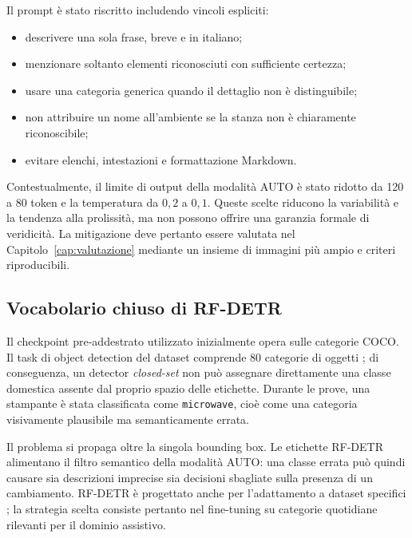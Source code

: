 Il prompt è stato riscritto includendo vincoli espliciti:

\begin{itemize}
    \item descrivere una sola frase, breve e in italiano;
    \item menzionare soltanto elementi riconosciuti con sufficiente certezza;
    \item usare una categoria generica quando il dettaglio non è distinguibile;
    \item non attribuire un nome all'ambiente se la stanza non è chiaramente
    riconoscibile;
    \item evitare elenchi, intestazioni e formattazione Markdown.
\end{itemize}

Contestualmente, il limite di output della modalità AUTO è stato ridotto da
120 a 80 token e la temperatura da \(0{,}2\) a \(0{,}1\). Queste scelte
riducono la variabilità e la tendenza alla prolissità, ma non possono offrire
una garanzia formale di veridicità. La mitigazione deve pertanto essere
valutata nel Capitolo~\ref{cap:valutazione} mediante un insieme di immagini
più ampio e criteri riproducibili.

\subsection{Vocabolario chiuso di RF-DETR}
\label{subsec:problemi-vocabolario-rfdetr}

Il checkpoint pre-addestrato utilizzato inizialmente opera sulle categorie
COCO. Il task di object detection del dataset comprende 80 categorie di
oggetti \cite{lin2014microsoft_coco}; di conseguenza, un detector
\emph{closed-set} non può assegnare direttamente una classe domestica assente
dal proprio spazio delle etichette. Durante le prove, una stampante è stata
classificata come \texttt{microwave}, cioè come una categoria visivamente
plausibile ma semanticamente errata.

Il problema si propaga oltre la singola bounding box. Le etichette RF-DETR
alimentano il filtro semantico della modalità AUTO: una classe errata può
quindi causare sia descrizioni imprecise sia decisioni sbagliate sulla
presenza di un cambiamento. RF-DETR è progettato anche per l'adattamento a
dataset specifici \cite{robinson2025rfdetr}; la strategia scelta consiste
pertanto nel fine-tuning su categorie quotidiane rilevanti per il dominio
assistivo.


